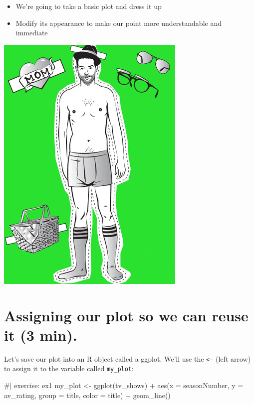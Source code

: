 \documentclass[
  letterpaper,
  DIV=11,
  numbers=noendperiod]{scrreprt}
\newenvironment{Shaded}{\begin{snugshade}}{\end{snugshade}}
\newcommand{\NormalTok}[1]{\textcolor[rgb]{0.00,0.23,0.31}{#1}}
\providecommand{\tightlist}{%
  \setlength{\itemsep}{0pt}\setlength{\parskip}{0pt}}\usepackage{longtable,booktabs,array}
\begin{document}
\begin{itemize}
\tightlist
\item
  We're going to take a basic plot and dress it up
\item
  Modify its appearance to make our point more understandable and
  immediate
\end{itemize}

\includegraphics{image/giphy.gif}

\section{Assigning our plot so we can reuse it (3
min).}\label{assigning-our-plot-so-we-can-reuse-it-3-min.}

Let's save our plot into an R object called a ggplot. We'll use the
\texttt{\textless{}-} (left arrow) to assign it to the variable called
\texttt{my\_plot}:

\begin{Shaded}
\begin{Highlighting}[]
\NormalTok{\#| exercise: ex1}
\NormalTok{my\_plot \textless{}{-} }
\NormalTok{  ggplot(tv\_shows) +}
\NormalTok{  aes(x = seasonNumber, }
\NormalTok{      y = av\_rating, }
\NormalTok{      group = title, }
\NormalTok{      color = title) + }
\NormalTok{  geom\_line()}
\end{Highlighting}
\end{Shaded}
\end{document}
